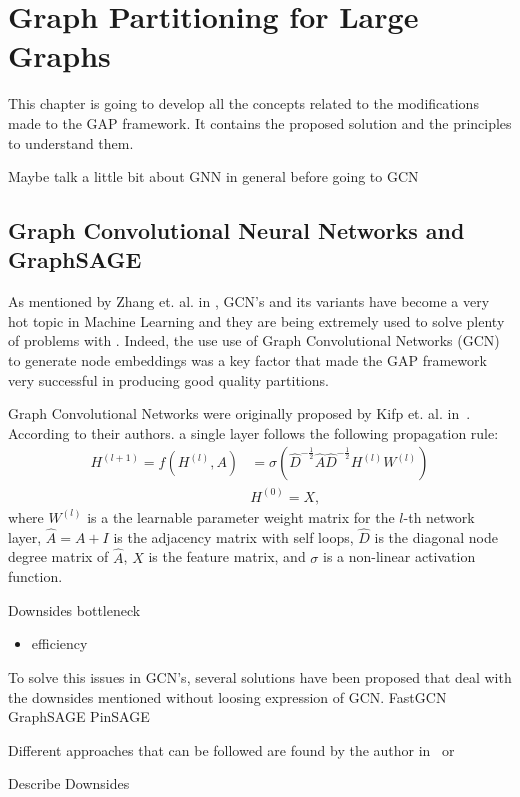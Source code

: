%
%
\let\textcircled=\pgftextcircled
\chapter{Graph Partitioning for Large Graphs}
\label{Chapter3}
This chapter is going to develop all the concepts related to the modifications made to the GAP framework. It contains the proposed solution and the principles to understand them.

Maybe talk a little bit about GNN in general before going to GCN
\section{Graph Convolutional Neural Networks and GraphSAGE}
As mentioned by Zhang et. al. in \cite{gcnreview}, GCN's and its variants have become a very hot topic in Machine Learning and they are being extremely used to solve plenty of problems with . Indeed, the use use of Graph Convolutional Networks (GCN) to generate node embeddings was a key factor that made the GAP framework very successful in producing good quality partitions.

Graph Convolutional Networks were originally proposed by Kifp et. al. in~\cite{gcn}. According to their authors. a single layer follows the following propagation rule:
\begin{align}
    H^{(l+1)} = f(H^{(l)}, A) &= \sigma\left(\hat{D}^{-\frac{1}{2}}\hat{A}\hat{D}^{-\frac{1}{2}}H^{(l)}W^{(l)}\right) \\
    & H^{(0)} = X,
\end{align}
where $W^{(l)}$ is a the learnable parameter weight matrix for the $l$-th network layer, $\hat{A}=A+I$ is the adjacency matrix with self loops, $\hat{D}$ is the diagonal node degree matrix of $\hat{A}$, $X$ is the feature matrix, and $\sigma$ is a non-linear activation function.

Downsides bottleneck
\begin{itemize}
    \item efficiency
\end{itemize}

To solve this issues in GCN's, several solutions have been proposed that deal with the downsides mentioned without loosing expression of GCN.
FastGCN
GraphSAGE 
PinSAGE

Different approaches that can be followed are found by the author in~\citep{gnnsurvey} or~\cite{hamilton}


Describe Downsides

